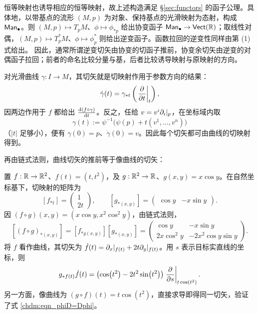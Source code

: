 恒等映射也诱导相应的恒等映射，故上述构造满足 \S\ref{sec:functors} 的函子公理。具体地，以带基点的流形 $(M,p)$ 为对象、保持基点的光滑映射为态射，构成 $\mathsf{Man}_\bullet$。则 $(M,p)\mapsto T_pM$、$\phi\mapsto\phi_{*p}$ 给出协变函子 $\mathsf{Man}_\bullet\to\mathsf{Vect}(\mathbb{R})$；取线性对偶，$(M,p)\mapsto T_p^*M$、$\phi\mapsto\phi_p^*$ 则给出逆变函子。函数拉回的逆变性同样由第 (1) 式给出。
因此，通常所谓逆变切矢由协变的切函子推前，协变余切矢由逆变的对偶函子拉回；前者的命名比较分量与基，后者比较诱导映射与原映射的方向。

\begin{example}
    对光滑曲线 $\gamma:I\to M$，其切矢就是切映射作用于参数方向的结果：
    \[
        \dot\gamma(t)=\gamma_{*t}\left(\left.\pdv{t}\right|_t\right),
    \]
    因两边作用于 $f$ 都给出 $\dv{(f\circ\gamma)}{t}$。反之，任给 $v=v^i\partial_i|_p$，在坐标域内取
    \[
        \gamma(t):=\psi^{-1}\bigl(\psi(p)+t(v^1,\ldots,v^n)\bigr)
    \]
    （$|t|$ 足够小），便有 $\gamma(0)=p$、$\dot\gamma(0)=v$。因此每个切矢都可由曲线的切映射得到。

    再由链式法则，曲线切矢的推前等于像曲线的切矢：
\end{example}

\begin{example}
    置 $f:\mathbb{R}\to\mathbb{R}^2$、$f(t)=(t,t^2)$，及 $g:\mathbb{R}^2\to\mathbb{R}$、$g(x,y)=x\cos y$。在自然坐标基下，切映射的矩阵为
    \[
        [f_{*t}]=\begin{pmatrix}1\\2t\end{pmatrix},\qquad
        [g_{*(x,y)}]=\begin{pmatrix}\cos y&-x\sin y\end{pmatrix}.
    \]
    因 $(f\circ g)(x,y)=(x\cos y,x^2\cos^2y)$，由链式法则，
    \[
        [(f\circ g)_{*(x,y)}]
        =[f_{*g(x,y)}][g_{*(x,y)}]
        =\begin{pmatrix}
            \cos y&-x\sin y\\
            2x\cos^2y&-2x^2\cos y\sin y
        \end{pmatrix}.
    \]
    将 $f$ 看作曲线，其切矢为 $\dot f(t)=\partial_x|_{f(t)}+2t\partial_y|_{f(t)}$。用 $s$ 表示目标实直线的坐标，则
    \[
        g_{*f(t)}\dot f(t)
        =\bigl(\cos(t^2)-2t^2\sin(t^2)\bigr)\left.\pdv{s}\right|_{t\cos(t^2)}.
    \]
    另一方面，像曲线为 $(g\circ f)(t)=t\cos(t^2)$，直接求导即得同一切矢，验证了式 \eqref{chdm:eqn_phiD=Dphi}。
\end{example}

